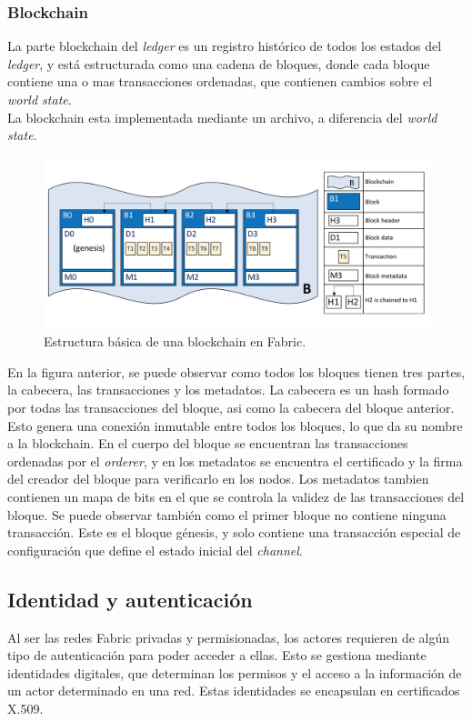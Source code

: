 \subsubsection{Blockchain}
La parte blockchain del \textit{ledger} es un registro histórico de todos los estados del \textit{ledger}, y está estructurada como una cadena de bloques, donde cada bloque contiene una o mas transacciones ordenadas, que contienen cambios sobre el \textit{world state}.\\
La blockchain esta implementada mediante un archivo, a diferencia del \textit{world state}.
\begin{figure}[H]
\centerline{\includegraphics[scale=0.3]{recursos/blockchain-ledger.png}}
\caption{Estructura básica de una blockchain en Fabric.}
\label{blockchain}
\end{figure}
En la figura anterior, se puede observar como todos los bloques tienen tres partes, la cabecera, las transacciones y los metadatos. La cabecera es un hash formado por todas las transacciones del bloque, asi como la cabecera del bloque anterior. Esto genera una conexión inmutable entre todos los bloques, lo que da su nombre a la blockchain. En el cuerpo del bloque se encuentran las transacciones ordenadas por el \textit{orderer}, y en los metadatos se encuentra el certificado y la firma del creador del bloque para verificarlo en los nodos. Los metadatos tambien contienen un mapa de bits en el que se controla la validez de las transacciones del bloque.
Se puede observar también como el primer bloque no contiene ninguna transacción. Este es el bloque génesis, y solo contiene una transacción especial de configuración que define el estado inicial del \textit{channel}.
\subsection{Identidad y autenticación}
Al ser las redes Fabric privadas y permisionadas, los actores requieren de algún tipo de autenticación para poder acceder a ellas. Esto se gestiona mediante identidades digitales, que determinan los permisos y el acceso a la información de un actor determinado en una red. Estas identidades se encapsulan en certificados X.509.
\clearpage
